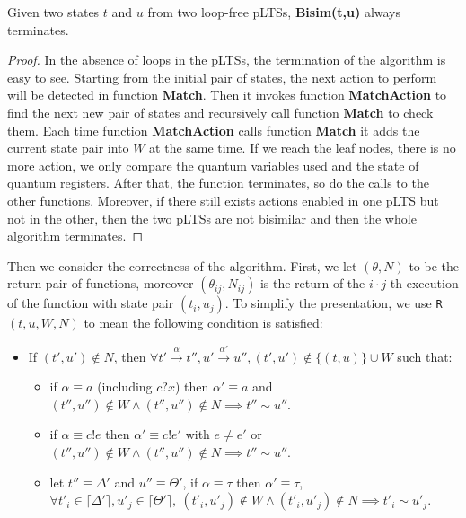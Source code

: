 \documentclass[a4paper,UKenglish,cleveref, autoref]{lipics-v2019}
\begin{document}
\begin{theorem}[Termination]

Given two states $t$ and $u$ from two loop-free pLTSs, \textbf{Bisim(t,u)} always terminates.
\end{theorem} 
\begin{proof}
In the absence of loops in the pLTSs, the termination of the algorithm is easy to see.
Starting from the initial pair of states, the next action to perform will be detected in function \textbf{Match}. Then it invokes function \textbf{MatchAction} to find the next new pair of states and recursively call function \textbf{Match} to check them. Each time function \textbf{MatchAction} calls function \textbf{Match} it adds the current state pair into $W$ at the same time. If we reach the leaf nodes, there is no more action, we only compare the quantum variables used and the state of quantum registers. After that, the function terminates, so do the calls to the other functions. Moreover, if there still exists actions enabled in one pLTS but not in the other, then the two pLTSs are not bisimilar and then the whole algorithm terminates. 
\end{proof}

Then we consider the correctness of the algorithm. First, we let $(\theta, N)$ to be the return pair of functions, moreover $(\theta_{ij}, N_{ij})$ is the return of the $i\cdot j$-th execution of the function with state pair $(t_i,u_j)$. To simplify the presentation, we use \texttt{R}$(t,u,W,N)$ to mean the following condition is satisfied:
\begin{itemize}
    \item If $(t',u')\notin N$, then $\forall t'\xrightarrow{\alpha}t'',u'\xrightarrow{\alpha'}u'', (t',u')\notin\{(t,u)\}\cup W$ such that: 
    \begin{itemize}
        \item if $\alpha\equiv a$ (including $c?x$) then $\alpha'\equiv a$ and $(t'',u'')\notin W\wedge(t'',u'')\notin N\implies t''\sim u''$.
        \item if $\alpha\equiv c!e$ then $\alpha'\equiv c!e'$ with $e\neq e'$ or $(t'',u'')\notin W\wedge(t'',u'')\notin N\implies t''\sim u''$.
        \item let $t''\equiv \Delta'$ and $u''\equiv \Theta'$, if $\alpha\equiv \tau$ then $\alpha'\equiv \tau$, $\forall t'_i\in \lceil\Delta'\rceil, u'_j\in \lceil\Theta'\rceil,\ (t'_i,u'_j)\notin W\wedge(t'_i,u'_j)\notin N\implies t'_i\sim u'_j$.
    \end{itemize}
\end{itemize}
\end{document}
